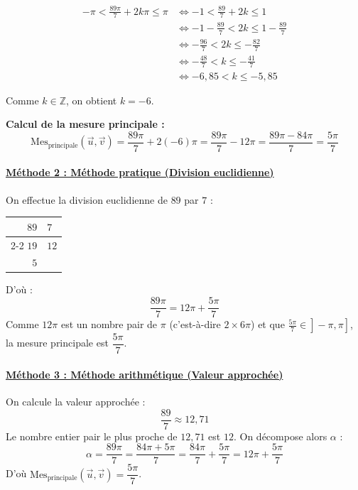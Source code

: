 \documentclass[12pt,a4paper]{article}
\begin{document}
\begin{align*}
-\pi < \frac{89\pi}{7} + 2k\pi \le \pi 
&\iff -1 < \frac{89}{7} + 2k \le 1 \\
&\iff -1 - \frac{89}{7} < 2k \le 1 - \frac{89}{7} \\
&\iff -\frac{96}{7} < 2k \le -\frac{82}{7} \\
&\iff -\frac{48}{7} < k \le -\frac{41}{7} \\
&\iff -6{,}85 < k \le -5{,}85
\end{align*}

Comme $k \in \mathbb{Z}$, on obtient $k = -6$.

\textbf{Calcul de la mesure principale :}
\[
\text{Mes}_{\text{principale}}(\vec{u}, \vec{v}) = \frac{89\pi}{7} + 2(-6)\pi = \frac{89\pi}{7} - 12\pi = \frac{89\pi - 84\pi}{7} = \frac{5\pi}{7}
\]

\vspace{0.3cm}

\paragraph{\underline{\textcolor{myred}{Méthode 2 : Méthode pratique (Division euclidienne)}}}
On effectue la division euclidienne de $89$ par $7$ :

\begin{center}
\begin{tabular}{r|l}
$89$ & $7$ \\
\cline{2-2}
$19$ & $12$ \\
$5$ & 
\end{tabular}
\end{center}

D'où :
\[
\frac{89\pi}{7} = 12\pi + \frac{5\pi}{7}
\]
Comme $12\pi$ est un nombre pair de $\pi$ (c'est-à-dire $2 \times 6\pi$) et que $\left.\left.\frac{5\pi}{7} \in \right]-\pi, \pi\right]$, la mesure principale est $\dfrac{5\pi}{7}$.

\vspace{0.3cm}

\paragraph{\underline{\textcolor{myred}{Méthode 3 : Méthode arithmétique (Valeur approchée)}}}
On calcule la valeur approchée :
\[
\frac{89}{7} \approx 12{,}71
\]
Le nombre entier pair le plus proche de $12{,}71$ est $12$. On décompose alors $\alpha$ :
\[
\alpha = \frac{89\pi}{7} = \frac{84\pi + 5\pi}{7} = \frac{84\pi}{7} + \frac{5\pi}{7} = 12\pi + \frac{5\pi}{7}
\]
D'où $\text{Mes}_{\text{principale}}(\vec{u}, \vec{v}) = \dfrac{5\pi}{7}$.
\end{document}
